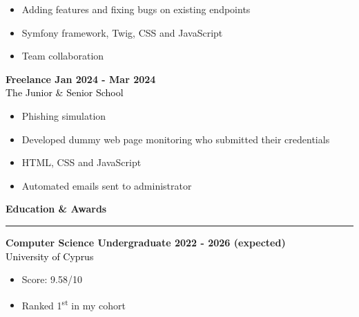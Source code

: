 \documentclass[12pt]{article}
\begin{document}
\begin{paracol}{2}
{\begin{itemize}[leftmargin=33pt, itemsep=0pt, topsep=0pt]
         \item Adding features and fixing bugs on existing endpoints\\
            \item Symfony framework, Twig, CSS and JavaScript\\
            \item Team collaboration\\
         \end{itemize}
      }
      \vspace{0.5cm}
      \textbf{\textcolor{bgcolor}{Freelance \hfill Jan 2024 - Mar 2024}}\\[0.5em]
      \textcolor{black}{The Junior \& Senior School}\\[0.5em]
      {\renewcommand{\labelitemi}{\textcolor{bgcolor}{\normalsize$\bullet$}}%
      \begin{itemize}[leftmargin=33pt, itemsep=0pt, topsep=0pt]
            \item Phishing simulation\\
            \item Developed dummy web page monitoring who submitted their credentials\\
            \item HTML, CSS and JavaScript\\
            \item Automated emails sent to administrator\\
         \end{itemize}
      }
      \vspace{1cm}
      {\fontsize{14pt}{13pt}\selectfont
      \textbf{\textcolor{bgcolor}{Education \& Awards}}\\[0.3em]
      }
      \hrule
      \vspace{0.5cm}
      \textbf{\textcolor{bgcolor}{Computer Science Undergraduate \hfill 2022 - 2026 (expected)}}\\[0.5em]
      \textcolor{black}{University of Cyprus}\\[0.5em]
      {\renewcommand{\labelitemi}{\textcolor{bgcolor}{\normalsize$\bullet$}}%
      \begin{itemize}[leftmargin=33pt, itemsep=0pt, topsep=0pt]
            \item Score: 9.58/10\\
            \item Ranked 1\textsuperscript{st} in my cohort\\
         \end{itemize}
}
\end{paracol}
\end{document}
